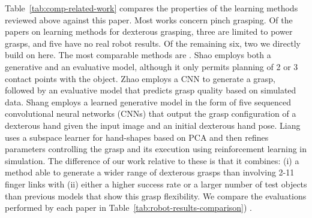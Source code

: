 Table~\ref{tab:comp-related-work} compares the properties of the learning methods reviewed above against this paper. Most works concern pinch grasping. Of the papers on learning methods for dexterous grasping, three \cite{varley2015generating,lu2017planning,detry2013a} are limited to power grasps, and five have no real robot results\cite{veres2017modeling,zhou20176dof,kappler2015leveraging,mandikal2021dexterous,Zhu2021}. Of the remaining six, two we directly build on here. The most comparable methods are \cite{Shao2020,Shang2020,Zhao2020,Liang22}. Shao \cite{Shao2020} employs both a generative and an evaluative model, although it only permits planning of 2 or 3 contact points with the object. Zhao \cite{Zhao2020} employs a CNN to generate a grasp, followed by an evaluative model that predicts grasp quality based on simulated data. Shang \cite{Shang2020} employs a learned generative model in the form of five sequenced convolutional neural networks (CNNs) that output the grasp configuration of a dexterous hand given the input image and an initial dexterous hand pose. Liang \cite{Liang22} uses a subspace learner for hand-shapes based on PCA and then refines parameters controlling the grasp and its execution using reinforcement learning in simulation. The difference of our work relative to these is that it combines: (i) a method able to  generate a wider range of dexterous grasps than \cite{varley2015generating,lu2017planning,detry2013a,Shao2020,Shang2020,Zhao2020} involving 2-11 finger links with (ii) either a higher success rate or a larger number of test objects than previous models that show this grasp flexibility. \cite{Liang22} We compare the evaluations performed by each paper in Table~\ref{tab:robot-results-comparison}) . 


